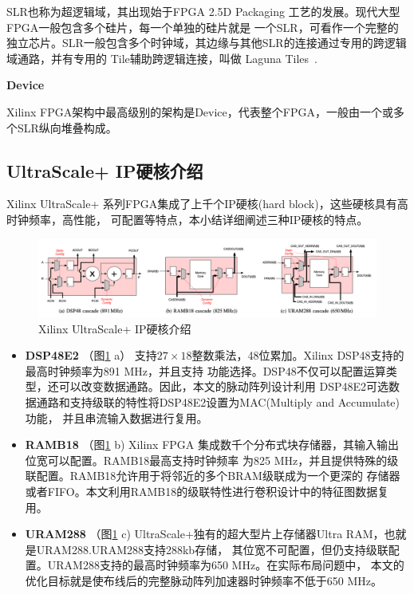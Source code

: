 SLR也称为超逻辑域，其出现始于FPGA 2.5D Packaging 工艺的发展。现代大型FPGA一般包含多个硅片，每一个单独的硅片就是
一个SLR，可看作一个完整的独立芯片。SLR一般包含多个时钟域，其边缘与其他SLR的连接通过专用的跨逻辑域通路，并有专用的
Tile辅助跨逻辑连接，叫做 Laguna Tiles~\cite{ug903}.


{\bf Device}

Xilinx FPGA架构中最高级别的架构是Device，代表整个FPGA，一般由一个或多个SLR纵向堆叠构成。






\subsection{UltraScale+ IP硬核介绍}

Xilinx UltraScale+ 系列FPGA集成了上千个IP硬核(hard block)，这些硬核具有高时钟频率，高性能，
可配置等特点，本小结详细阐述三种IP硬核的特点。

\begin{figure}[h]
    \centering
	\includegraphics[width=\textwidth]{figure/hardblocks}
	\caption{Xilinx UltraScale+ IP硬核介绍~\cite{nachiket_stc_fpl2019}} 
	\label{fig:hardblocks}
\end{figure}

\begin{itemize}
    \item {\bf DSP48E2} （图\ref{fig:hardblocks} a）
    支持$27\times18$整数乘法，48位累加。Xilinx DSP48支持的最高时钟频率为891 MHz，并且支持
    功能选择。DSP48不仅可以配置运算类型，还可以改变数据通路。因此，本文的脉动阵列设计利用
    DSP48E2可选数据通路和支持级联的特性将DSP48E2设置为MAC(Multiply and Accumulate)功能，
    并且串流输入数据进行复用。
    
    \item {\bf RAMB18} （图\ref{fig:hardblocks} b)
    Xilinx FPGA 集成数千个分布式块存储器，其输入输出位宽可以配置。RAMB18最高支持时钟频率
    为825 MHz，并且提供特殊的级联配置。RAMB18允许用于将邻近的多个BRAM级联成为一个更深的
    存储器或者FIFO。本文利用RAMB18的级联特性进行卷积设计中的特征图数据复用。
    
    \item {\bf URAM288} （图\ref{fig:hardblocks} c)
    UltraScale+独有的超大型片上存储器Ultra RAM，也就是URAM288.URAM288支持288kb存储，
    其位宽不可配置，但仍支持级联配置。URAM288支持的最高时钟频率为650 MHz。在实际布局问题中，
    本文的优化目标就是使布线后的完整脉动阵列加速器时钟频率不低于650 MHz。

\end{itemize}



